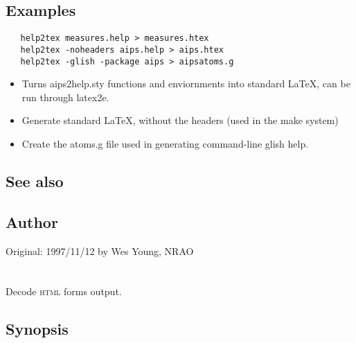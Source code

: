 \subsection*{Examples}

\begin{verbatim}
   help2tex measures.help > measures.htex
   help2tex -noheaders aips.help > aips.htex
   help2tex -glish -package aips > aipsatoms.g
\end{verbatim}

\noindent
\begin{itemize}
\item Turns aips2help.sty functions and enviornments into standard LaTeX, can
be run through latex2e.
\item Generate standard LaTeX, without the headers (used in the make system)
\item Create the atoms.g file used in generating command-line glish help.
\end{itemize}
 
\subsection*{See also}
\begin{itemize}
\end{itemize}
 
\subsection*{Author}
 
Original: 1997/11/12 by Wes Young, NRAO

\newpage
\section{}
\label{parseform}

Decode \textsc{html} forms output.

\subsection*{Synopsis}
 
